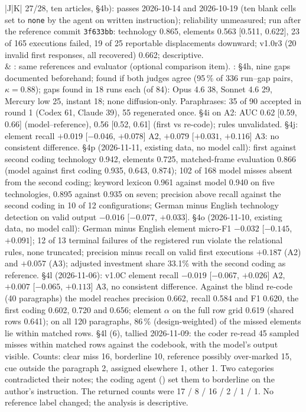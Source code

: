 \documentclass[12pt]{article}
\begin{document}
{\begin{longtable}{|J|K|}
27/28, ten articles, \S4b): passes 2026-10-14 and 2026-10-19 (ten blank cells set to \texttt{none} by the agent on written instruction); reliability unmeasured; run after the reference commit \texttt{3f633bb}: technology 0.865, elements 0.563 [0.511, 0.622], 23 of 165 executions failed, 19 of 25 reportable displacements downward; v1.0r3 (20 invalid first responses, all recovered) 0.662; descriptive.
\\[2pt]
& : same references and evaluator (optional comparison item). : \S4h, nine gaps documented beforehand; found if both judges agree (95\,\% of 336 run--gap pairs, $\kappa = 0.88$); gaps found in 18 runs each (of 84): Opus 4.6 38, Sonnet 4.6 29, Mercury low 25, instant 18; none diffusion-only. Paraphrases: 35 of 90 accepted in round 1 (Codex 61, Claude 39), 55 regenerated once. \S4i on A2: AUC 0.62 [0.59, 0.66] (model--reference), 0.56 [0.52, 0.61] (first vs re-code); rules unvalidated. \S4j: element recall $+0.019$ [$-0.046$, $+0.078$] A2, $+0.079$ [$+0.031$, $+0.116$] A3: no consistent difference. \S4p (2026-11-11, existing data, no model call): first against second coding technology 0.942, elements 0.725, matched-frame evaluation 0.866 (model against first coding 0.935, 0.643, 0.874); 102 of 168 model misses absent from the second coding; keyword lexicon 0.961 against model 0.940 on five technologies, 0.895 against 0.935 on seven; precision above recall against the second coding in 10 of 12 configurations; German minus English technology detection on valid output $-0.016$ [$-0.077$, $+0.033$]. \S4o (2026-11-10, existing data, no model call): German minus English element micro-F1 $-0.032$ [$-0.145$, $+0.091$]; 12 of 13 terminal failures of the registered run violate the relational rules, none truncated; precision minus recall on valid first executions $+0.187$ (A2) and $+0.057$ (A3); adjusted investment share 33.1\% with the second coding as reference. \S4l (2026-11-06): v1.0C element recall $-0.019$ [$-0.067$, $+0.026$] A2, $+0.007$ [$-0.065$, $+0.113$] A3, no consistent difference. Against the blind re-code (40 paragraphs) the model reaches precision 0.662, recall 0.584 and F1 0.620, the first coding 0.602, 0.720 and 0.656; element $\alpha$ on the full row grid 0.619 (shared rows 0.641); on all 120 paragraphs, 86\,\% (design-weighted) of the missed elements lie within matched rows. \S4l (6), tallied 2026-11-09: the coder re-read 45 sampled misses within matched rows against the codebook, with the model's output visible. Counts: clear miss 16, borderline 10, reference possibly over-marked 15, cue outside the paragraph 2, assigned elsewhere 1, other 1. Two categories contradicted their notes; the coding agent () set them to borderline on the author's instruction. The returned counts were 17 / 8 / 16 / 2 / 1 / 1. No reference label changed; the analysis is descriptive.

\end{longtable}}
\end{document}
